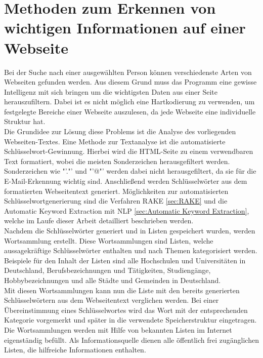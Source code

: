 			

\section{Methoden zum Erkennen von wichtigen Informationen auf einer Webseite}
\label{subsec:ErkennenVonInformation}
Bei der Suche nach einer ausgewählten Person können verschiedenste Arten von Webseiten gefunden werden. Aus diesem Grund muss das Programm eine gewisse Intelligenz mit sich bringen um die wichtigsten Daten aus einer Seite herauszufiltern. Dabei ist es nicht möglich eine Hartkodierung zu verwenden, um festgelegte Bereiche einer Webseite auszulesen, da jede Webseite eine individuelle Struktur hat.\\
Die Grundidee zur Lösung diese Problems ist die Analyse des vorliegenden Webseiten-Textes. Eine Methode zur Textanalyse ist die automatisierte Schlüsselwort-Gewinnung. Hierbei wird die HTML-Seite zu einem verwendbaren Text formatiert, wobei die meisten Sonderzeichen herausgefiltert werden. Sonderzeichen wie "'."' und "'@"' werden dabei nicht herausgefiltert, da sie für die E-Mail-Erkennung wichtig sind. Anschließend werden Schlüsselwörter aus dem formatierten Webseitentext generiert. Möglichkeiten zur automatisierten Schlüsselwortgenerierung sind die Verfahren RAKE \ref{sec:RAKE} und die Automatic Keyword Extraction mit NLP \ref{sec:Automatic Keyword Extraction}, welche im Laufe dieser Arbeit detailliert beschrieben werden.\\
Nachdem die Schlüsselwörter generiert und in Listen gespeichert wurden, werden Wortsammlung erstellt. Diese Wortsammlungen sind Listen, welche aussagekräftige Schlüsselwörter enthalten und nach Themen kategorisiert werden. Beispiele für den Inhalt der Listen sind alle Hochschulen und Universitäten in Deutschland, Berufsbezeichnungen und Tätigkeiten, Studiengänge, Hobbybezeichnungen und alle Städte und Gemeinden in Deutschland.\\
Mit diesen Wortsammlungen kann nun die Liste mit den bereits generierten Schlüsselwörtern aus dem Webseitentext verglichen werden. Bei einer Übereinstimmung eines Schlüsselwortes wird das Wort mit der entsprechenden Kategorie vorgemerkt und später in die verwendete Speicherstruktur eingetragen. \\
Die Wortsammlungen werden mit Hilfe von bekannten Listen im Internet eigenständig befüllt. Als Informationsquelle dienen alle öffentlich frei zugänglichen Listen, die hilfreiche Informationen enthalten.

